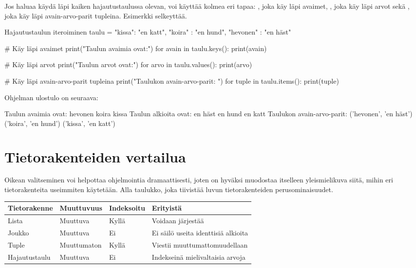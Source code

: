 Jos haluaa käydä läpi kaiken hajautustaulussa olevan, voi käyttää kolmea eri tapaa: , joka käy läpi avaimet, , joka käy läpi arvot sekä , joka käy läpi avain-arvo-parit tupleina. Esimerkki selkeyttää.

\begin{example}{Hajautustaulun iteroiminen}
taulu = { "kissa": "en katt", "koira" : "en hund", "hevonen" : "en häst"}

# Käy läpi avaimet
print("Taulun avaimia ovat:")
for avain in taulu.keys():
	print(avain)

# Käy läpi arvot
print("Taulun arvot ovat:")
for arvo in taulu.values():
	print(arvo)

# Käy läpi avain-arvo-parit tupleina
print("Taulukon avain-arvo-parit: ")
for tuple in taulu.items():
	print(tuple)
\end{example}

Ohjelman ulostulo on seuraava:

\begin{output}
Taulun avaimia ovat:
hevonen
koira
kissa
Taulun alkioita ovat:
en häst
en hund
en katt
Taulukon avain-arvo-parit: 
('hevonen', 'en häst')
('koira', 'en hund')
('kissa', 'en katt')
\end{output}

\section{Tietorakenteiden vertailua}

Oikean  valitseminen voi helpottaa ohjelmointia dramaattisesti, joten on hyväksi muodostaa itselleen yleismielikuva siitä, mihin eri tietorakenteita useimmiten käytetään. Alla taulukko, joka tiivistää luvun tietorakenteiden perusominaisuudet.

\begin{tabularx}{\textwidth}{ |X|X|X|X| }
\hline
\textbf{Tietorakenne} & \textbf{Muuttuvuus} & \textbf{Indeksoitu} & \textbf{Erityistä} \\ \hline
Lista & Muuttuva & Kyllä & Voidaan järjestää \\ \hline
Joukko & Muuttuva & Ei & Ei säilö useita identtisiä alkioita \\ \hline
Tuple & Muuttumaton & Kyllä & Viestii muuttumattomuudellaan \\ \hline
Hajautustaulu & Muuttuva & Ei & Indekseinä mielivaltaisia arvoja \\ \hline
\end{tabularx}

